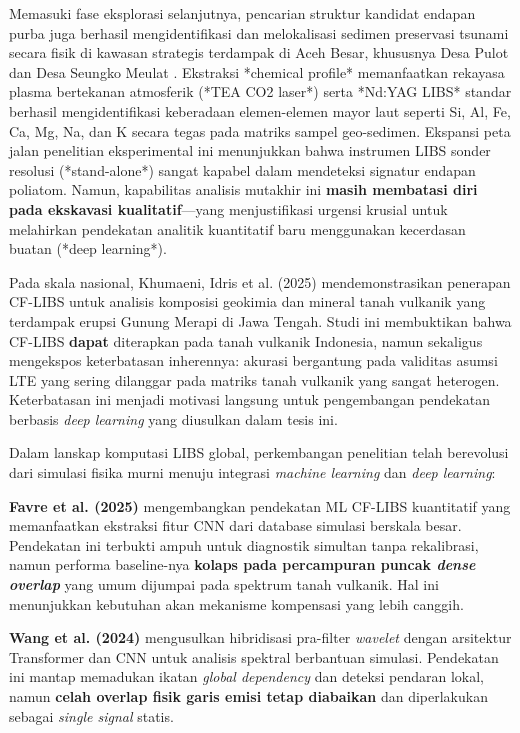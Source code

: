 \documentclass[12pt, a4paper]{article}
\begin{document}
Memasuki fase eksplorasi selanjutnya, pencarian struktur kandidat endapan purba juga berhasil mengidentifikasi dan melokalisasi sedimen preservasi tsunami secara fisik di kawasan strategis terdampak di Aceh Besar, khususnya Desa Pulot \citep{mitaphonna_characteristics_2023} dan Desa Seungko Meulat \citep{mitaphonna_preliminary_2024}. Ekstraksi *chemical profile* memanfaatkan rekayasa plasma bertekanan atmosferik (*TEA CO2 laser*) \citep{mitaphonna_characteristics_2023, mitaphonna_pulsed_2024} serta *Nd:YAG LIBS* standar \citep{mitaphonna_pulsed_2024} berhasil mengidentifikasi keberadaan elemen-elemen mayor laut seperti Si, Al, Fe, Ca, Mg, Na, dan K secara tegas pada matriks sampel geo-sedimen. Ekspansi peta jalan penelitian eksperimental ini menunjukkan bahwa instrumen LIBS sonder resolusi (*stand-alone*) sangat kapabel dalam mendeteksi signatur endapan poliatom. Namun, kapabilitas analisis mutakhir ini \textbf{masih membatasi diri pada ekskavasi kualitatif}—yang menjustifikasi urgensi krusial untuk melahirkan pendekatan analitik kuantitatif baru menggunakan kecerdasan buatan (*deep learning*).

Pada skala nasional, Khumaeni, Idris et al. (2025) \citep{khumaeni_analysis_2025} mendemonstrasikan penerapan CF-LIBS untuk analisis komposisi geokimia dan mineral tanah vulkanik yang terdampak erupsi Gunung Merapi di Jawa Tengah. Studi ini membuktikan bahwa CF-LIBS \textbf{dapat} diterapkan pada tanah vulkanik Indonesia, namun sekaligus mengekspos keterbatasan inherennya: akurasi bergantung pada validitas asumsi LTE yang sering dilanggar pada matriks tanah vulkanik yang sangat heterogen. Keterbatasan ini menjadi motivasi langsung untuk pengembangan pendekatan berbasis \textit{deep learning} yang diusulkan dalam tesis ini.

Dalam lanskap komputasi LIBS global, perkembangan penelitian telah berevolusi dari simulasi fisika murni menuju integrasi \textit{machine learning} dan \textit{deep learning}:

\textbf{Favre et al. (2025)} \citep{favre2025b} mengembangkan pendekatan ML CF-LIBS kuantitatif yang memanfaatkan ekstraksi fitur CNN dari database simulasi berskala besar. Pendekatan ini terbukti ampuh untuk diagnostik simultan tanpa rekalibrasi, namun performa baseline-nya \textbf{kolaps pada percampuran puncak \textit{dense overlap}} yang umum dijumpai pada spektrum tanah vulkanik. Hal ini menunjukkan kebutuhan akan mekanisme kompensasi yang lebih canggih.

\textbf{Wang et al. (2024)} \citep{wang2024} mengusulkan hibridisasi pra-filter \textit{wavelet} dengan arsitektur Transformer dan CNN untuk analisis spektral berbantuan simulasi. Pendekatan ini mantap memadukan ikatan \textit{global dependency} dan deteksi pendaran lokal, namun \textbf{celah overlap fisik garis emisi tetap diabaikan} dan diperlakukan sebagai \textit{single signal} statis.
\end{document}
